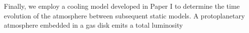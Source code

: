 





Finally, we employ a cooling model developed in Paper I to determine the time evolution of the atmosphere between subsequent static models. A protoplanetary atmosphere embedded in a gas disk emits a total luminosity


